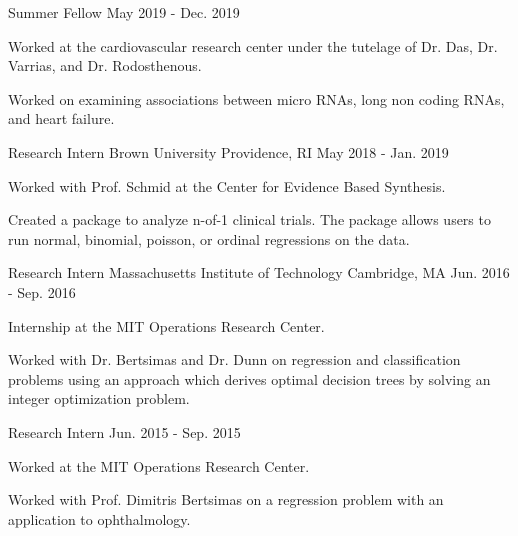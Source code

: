 \begin{cventries}
  \cventry
    {Summer Fellow} %
    {} %
    {} %
    {May 2019 - Dec. 2019} %
    {
      \begin{cvitems} %
        \item {Worked at the cardiovascular research center under the tutelage of Dr. Das, Dr. Varrias, and Dr. Rodosthenous.} 
        \item {Worked on examining associations between micro RNAs, long non
        coding RNAs, and heart failure.}
      \end{cvitems}
    }

\vspace{-1mm}
  \cventry
    {Research Intern} %
    {Brown University} %
    {Providence, RI} %
    {May 2018 - Jan. 2019} %
    {
      \begin{cvitems} %
        \item {Worked with Prof. Schmid at the Center for Evidence Based Synthesis.} 
        \item {Created a package to analyze n-of-1 clinical trials. The package
        allows users to run normal, binomial, poisson, or ordinal regressions
        on the data.}
      \end{cvitems}
    }

  \cventry
    {Research Intern} %
    {Massachusetts Institute of Technology} %
    {Cambridge, MA} %
    {Jun. 2016 - Sep. 2016} %
    {
      \begin{cvitems} %
        \item {Internship at the MIT Operations Research Center.}
        \item {Worked with Dr. Bertsimas and Dr. Dunn on regression and
        classification problems using an approach which derives optimal decision
        trees by solving an integer optimization problem.}
      \end{cvitems}
    }

  \cventry
    {Research Intern} %
    {} %
    {} %
    {Jun. 2015 - Sep. 2015} %
    {
      \begin{cvitems} %
        \item {Worked at the MIT Operations Research Center.}
        \item {Worked with Prof. Dimitris Bertsimas on a regression problem
        with an application to ophthalmology.}
      \end{cvitems}
    }

\end{cventries}
